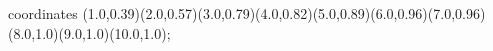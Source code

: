 					coordinates { (1.0,0.39)(2.0,0.57)(3.0,0.79)(4.0,0.82)(5.0,0.89)(6.0,0.96)(7.0,0.96)(8.0,1.0)(9.0,1.0)(10.0,1.0)};